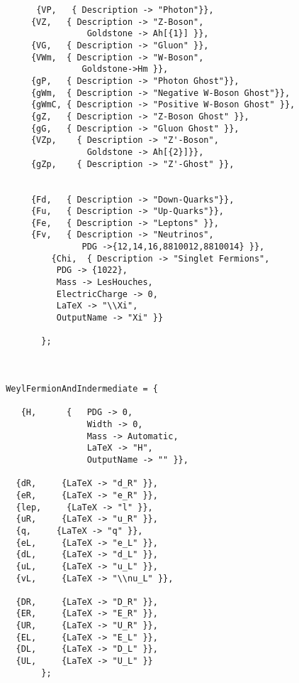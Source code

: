 \begin{lstlisting}
       {VP,   { Description -> "Photon"}}, 
      {VZ,   { Description -> "Z-Boson",
      			 Goldstone -> Ah[{1}] }}, 
      {VG,   { Description -> "Gluon" }},          
      {VWm,  { Description -> "W-Boson",
                Goldstone->Hm }},         
      {gP,   { Description -> "Photon Ghost"}},                                                   
      {gWm,  { Description -> "Negative W-Boson Ghost"}}, 
      {gWmC, { Description -> "Positive W-Boson Ghost" }}, 
      {gZ,   { Description -> "Z-Boson Ghost" }},
      {gG,   { Description -> "Gluon Ghost" }},          
      {VZp,    { Description -> "Z'-Boson",
      			 Goldstone -> Ah[{2}]}},  
      {gZp,    { Description -> "Z'-Ghost" }},    
                               
                 
      {Fd,   { Description -> "Down-Quarks"}},   
      {Fu,   { Description -> "Up-Quarks"}},   
      {Fe,   { Description -> "Leptons" }},
      {Fv,   { Description -> "Neutrinos",
      			PDG ->{12,14,16,8810012,8810014} }},
          {Chi,  { Description -> "Singlet Fermions",
	       PDG -> {1022},
	       Mass -> LesHouches,
	       ElectricCharge -> 0,
	       LaTeX -> "\\Xi",
	       OutputName -> "Xi" }}      
     
        };    
        
        
        
 WeylFermionAndIndermediate = {
     
    {H,      {   PDG -> 0,
                 Width -> 0, 
                 Mass -> Automatic,
                 LaTeX -> "H",
                 OutputName -> "" }},

   {dR,     {LaTeX -> "d_R" }},
   {eR,     {LaTeX -> "e_R" }},
   {lep,     {LaTeX -> "l" }},
   {uR,     {LaTeX -> "u_R" }},
   {q,     {LaTeX -> "q" }},
   {eL,     {LaTeX -> "e_L" }},
   {dL,     {LaTeX -> "d_L" }},
   {uL,     {LaTeX -> "u_L" }},
   {vL,     {LaTeX -> "\\nu_L" }},

   {DR,     {LaTeX -> "D_R" }},
   {ER,     {LaTeX -> "E_R" }},
   {UR,     {LaTeX -> "U_R" }},
   {EL,     {LaTeX -> "E_L" }},
   {DL,     {LaTeX -> "D_L" }},
   {UL,     {LaTeX -> "U_L" }}
        };       
\end{lstlisting}




